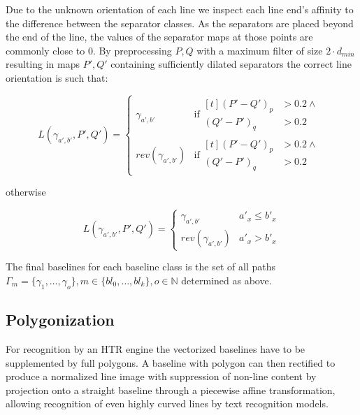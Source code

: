 Due to the unknown orientation of each line we inspect each line end's affinity
to the difference between the separator classes. As the separators are placed
beyond the end of the line, the values of the separator maps at those points
are commonly close to $0$. By preprocessing $P, Q$ with a maximum filter of
size $2 \cdot d_{min}$ resulting in maps $P', Q'$ containing sufficiently
dilated separators the correct line orientation is such that:

\begin{equation*}
	L(\gamma_{a', b'}, P', Q') = 
	\begin{cases}
		\gamma_{a', b'} &\text{if}
				\!\begin{aligned}[t]
					(P'-Q')_p &> 0.2 \land \\
					(Q'-P')_q &> 0.2
				\end{aligned}\\
		rev(\gamma_{a', b'}) & \text{if}
				\!\begin{aligned}[t]
					(P'-Q')_p &> 0.2 \land \\
					(Q'-P')_q &> 0.2
				\end{aligned}
	\end{cases}
\end{equation*}

otherwise 

\begin{equation*}
	L(\gamma_{a', b'}, P', Q') = 
	\begin{cases}
		\gamma_{a', b'} & a'_x \leq b'_x\\
		rev(\gamma_{a', b'}) & a'_x > b'_x
	\end{cases}
\end{equation*}

The final baselines for each baseline class is the set of all paths $\Gamma_m =
\{\gamma_1, \dots, \gamma_o\}, m \in \{bl_0, \dots, bl_k\}, o \in \mathbb{N}$ determined as above.

\subsection{Polygonization}

For recognition by an HTR engine the vectorized baselines have to be
supplemented by full polygons. A baseline with polygon can then rectified to
produce a normalized line image with suppression of non-line content by
projection onto a straight baseline through a piecewise affine transformation,
allowing recognition of even highly curved lines by text recognition models.

